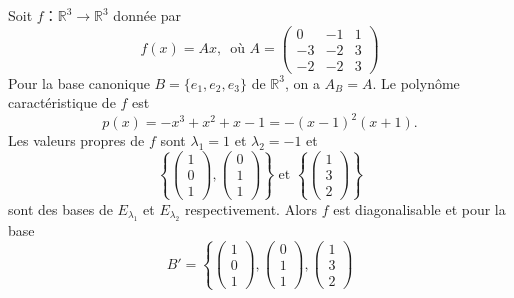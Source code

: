 \begin{example}
  \label{exe:51}
  Soit $f： ℝ^3 → ℝ^3$ donnée par
  \begin{displaymath}
      f(x) = Ax, \, \text{ où }      A =  \begin{pmatrix}
        0 & -1 & 1 \\
        -3 & -2 & 3 \\
        -2 & -2 & 3
      \end{pmatrix}      
    \end{displaymath}
    Pour la base canonique  $B = \{e_1,e_2,e_3\}$ de $ℝ^3$, on a $A_B =A$. Le polynôme caractéristique de $f$ est
    \begin{displaymath}
      p(x) = -x^3 + x^2 + x -1 = - (x-1)^2 (x+1). 
    \end{displaymath}
    Les valeurs propres de $f$ sont $λ_1 = 1$ et $λ_2 = -1$ et
    \begin{displaymath}
      \left\{
          \begin{pmatrix}
            1 \\ 0 \\1
          \end{pmatrix},
          \begin{pmatrix}
            0 \\ 1 \\ 1
          \end{pmatrix} \right\} \text{ et }  \left\{
          \begin{pmatrix}
            1 \\ 3 \\2
          \end{pmatrix} \right\}
    \end{displaymath}
    sont des bases de $E_{λ_1}$ et  $E_{λ_2}$  respectivement. Alors $f$ est diagonalisable et pour la base
    \begin{displaymath}
      B' =  \left\{
          \begin{pmatrix}
            1 \\ 0 \\1
          \end{pmatrix},
          \begin{pmatrix}
            0 \\ 1 \\ 1
          \end{pmatrix}, 
          \begin{pmatrix}
            1 \\ 3 \\2

\end{pmatrix}
\end{displaymath}
\end{example}
